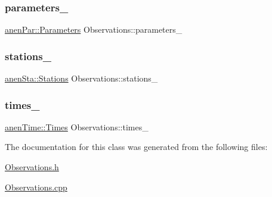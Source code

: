 \subsubsection{\texorpdfstring{parameters\+\_\+}{parameters\_}}
{\footnotesize\ttfamily \mbox{\hyperlink{classanen_par_1_1_parameters}{anen\+Par\+::\+Parameters}} Observations\+::parameters\+\_\+\hspace{0.3cm}{\ttfamily [protected]}}

\mbox{\label{class_observations_a03e2d3c69e46066f48e4381657a995f7}} 
\subsubsection{\texorpdfstring{stations\+\_\+}{stations\_}}
{\footnotesize\ttfamily \mbox{\hyperlink{classanen_sta_1_1_stations}{anen\+Sta\+::\+Stations}} Observations\+::stations\+\_\+\hspace{0.3cm}{\ttfamily [protected]}}

\mbox{\label{class_observations_ad379be63239b03e0db53dc31014a2d74}} 
\subsubsection{\texorpdfstring{times\+\_\+}{times\_}}
{\footnotesize\ttfamily \mbox{\hyperlink{classanen_time_1_1_times}{anen\+Time\+::\+Times}} Observations\+::times\+\_\+\hspace{0.3cm}{\ttfamily [protected]}}



The documentation for this class was generated from the following files\+:\begin{DoxyCompactItemize}
\item 
\mbox{\hyperlink{_observations_8h}{Observations.\+h}}\item 
\mbox{\hyperlink{_observations_8cpp}{Observations.\+cpp}}\end{DoxyCompactItemize}
